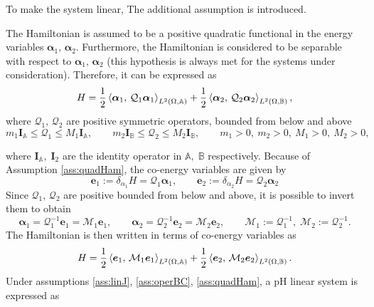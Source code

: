 To make the system linear, The additional assumption is introduced.

\begin{assumption}\label{ass:quadHam}
	The Hamiltonian is assumed to be a positive quadratic functional in the energy variables $\bm{\alpha}_1, \, \bm{\alpha}_2$. Furthermore, the Hamiltonian is considered to be separable  with respect to $\bm{\alpha}_1, \, \bm{\alpha}_2$ (this hypothesis is always met for the systems under consideration). Therefore, it can be expressed as 
	\begin{equation}
		H = \frac{1}{2} \inner[L^2(\Omega, \mathbb{A})]{\bm{\alpha}_{1}}{\mathcal{Q}_1\bm{\alpha}_{1}} + \frac{1}{2} \inner[L^2(\Omega, \mathbb{B})]{\bm{\alpha}_{2}}{\mathcal{Q}_2\bm{\alpha}_{2}},
	\end{equation}
	where $\mathcal{Q}_1, \, \mathcal{Q}_2$ are positive symmetric operators, bounded from below and above
	\begin{equation*}
	m_1 \bm{I}_\mathbb{A} \le\mathcal{Q}_1 \le M_1 \bm{I}_\mathbb{A}, \qquad  m_2 \bm{I}_\mathbb{B} \le \mathcal{Q}_2 \le M_2 \bm{I}_\mathbb{B}, \qquad m_1>0, \ m_2>0, \ M_1>0, \ M_2>0,
	\end{equation*} 
\end{assumption}
where $\bm{I}_\mathbb{A}, \; \bm{I}_2$ are the identity operator in $\mathbb{A}, \; \mathbb{B}$ respectively. 
Because of Assumption \ref{ass:quadHam}, the co-energy variables are given by 
\begin{equation}\label{eq:e_lin}
	\bm{e}_1 := \delta_{\alpha_1} H = \mathcal{Q}_1 \bm{\alpha}_1, \qquad \bm{e}_2 := \delta_{\alpha_2} H = \mathcal{Q}_2 \bm{\alpha}_2
\end{equation}
Since $\mathcal{Q}_1, \, \mathcal{Q}_2$ are positive bounded from below and above, it is possible to invert them to obtain
\begin{equation}\label{eq:alpha_lin}
\bm{\alpha}_1 = \mathcal{Q}_1^{-1}\bm{e}_1 = \mathcal{M}_1\bm{e}_1, \qquad  \bm{\alpha}_2 = \mathcal{Q}_2^{-1} \bm{e}_2 = \mathcal{M}_2 \bm{e}_2, \qquad \mathcal{M}_1 := \mathcal{Q}_1^{-1}, \; \mathcal{M}_2 := \mathcal{Q}_2^{-1}.
\end{equation}
The Hamiltonian is then written in terms of co-energy variables as 
\begin{equation}\label{eq:H_coenergy}
H = \frac{1}{2} \inner[L^2(\Omega, \mathbb{A})]{\bm{e}_{1}}{\mathcal{M}_1\bm{e}_{1}} + \frac{1}{2} \inner[L^2(\Omega, \mathbb{B})]{\bm{e}_{2}}{\mathcal{M}_2\bm{e}_{2}}.
\end{equation}
Under assumptions \ref{ass:linJ}, \ref{ass:operBC}, \ref{ass:quadHam}, a pH linear system is expressed as 


